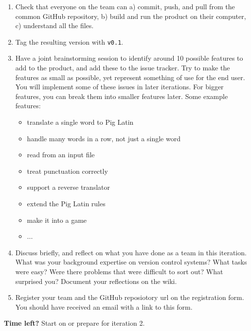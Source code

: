 \documentclass[swedish,english]{article}
\begin{document}
\begin{enumerate}
\item Check that everyone on the team can a) commit, push, and pull from the common GitHub repository, b) build and run the product on their computer, c) understand all the files.

\item Tag the resulting version with \verb'v0.1'.

\item Have a joint brainstorming session to identify around 10 possible features to add to the product, and add these to the issue tracker. Try to make the features as small as possible, yet represent something of use for the end user. You will implement some of these issues in later iterations. For bigger features, you can break them into smaller features later. Some example features:
\begin{itemize}
\item translate a single word to Pig Latin
\item handle many words in a row, not just a single word
\item read from an input file
\item treat punctuation correctly
\item support a reverse translator
\item extend the Pig Latin rules
\item make it into a game
\item ...
\end{itemize}

\item Discuss briefly, and reflect on what you have done as a team in this iteration. What was your background expertise on version control systems? What tasks were easy? Were there problems that were difficult to sort out? What surprised you? Document your reflections on the wiki.

\item Register your team and the GitHub reposiotory url on the registration form. You should have received an email with a link to this form.
\end{enumerate}

\textbf{Time left?} Start on or prepare for iteration 2.

\newpage
\end{document}
